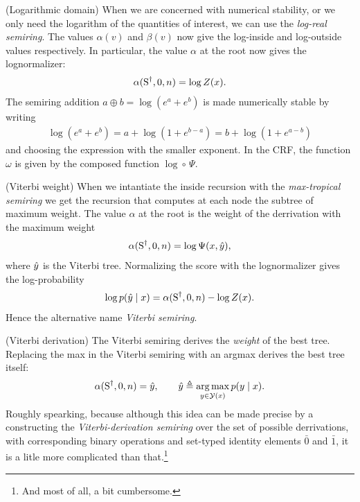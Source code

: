 \begin{example}{(Logarithmic domain)}
  When we are concerned with numerical stability, or we only need the logarithm of the quantities of interest, we can use the \textit{log-real semiring}. The values $\alpha(v)$ and $\beta(v)$ now give the log-inside and log-outside values respectively. In particular, the value $\alpha$ at the root now gives the lognormalizer:
  \begin{align*}
    \alpha(\text{S}^{\dagger}, 0, n) = \log Z(x).
  \end{align*}
  The semiring addition $a \oplus b = \log(e^{a} + e^{b})$ is made numerically stable by writing
  \begin{align*}
    \log(e^{a} + e^{b}) = a + \log(1 + e^{b-a}) = b + \log(1 + e^{a-b})
  \end{align*}
  and choosing the expression with the smaller exponent. In the CRF, the function $\omega$ is given by the composed function $\log \circ \, \Psi$.
\end{example}

\begin{example}{(Viterbi weight)}
  \label{ex:vit-weight}
  When we intantiate the inside recursion with the \textit{max-tropical semiring} we get the recursion that computes at each node the subtree of maximum weight. The value $\alpha$ at the root is the weight of the derrivation with the maximum weight
  \begin{align*}
    \alpha(\text{S}^{\dagger}, 0, n) = \log \Psi(x, \hat{y}),
  \end{align*}
  where $\hat{y}$ is the Viterbi tree. Normalizing the score with the lognormalizer gives the log-probability
  \begin{align*}
    \log p(\hat{y} \mid x) = \alpha(\text{S}^{\dagger}, 0, n) - \log Z(x).
  \end{align*}
  Hence the alternative name \textit{Viterbi semiring}.
\end{example}

\begin{example}{(Viterbi derivation)}
  \label{ex:vit-derivation}
  The Viterbi semiring derives the \textit{weight} of the best tree. Replacing the max in the Viterbi semiring with an argmax derives the best tree itself:
  \begin{align*}
    \alpha(\text{S}^{\dagger}, 0, n) = \hat{y}, \qquad \hat{y} \triangleq \operatorname*{arg\,max}_{y \in \mathcal{Y}(x)} p(y \mid x).
  \end{align*}
  Roughly spearking, because although this idea can be made precise by a constructing the \textit{Viterbi-derivation semiring} \citep{goodman1999semiring} over the set of possible derrivations, with corresponding binary operations and set-typed identity elements $\bar{0}$ and $\bar{1}$, it is a litle more complicated than that.\footnote{And most of all, a bit cumbersome.}
\end{example}

